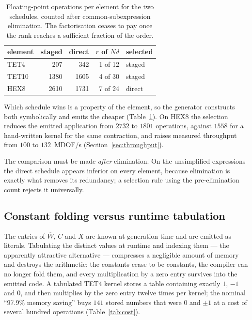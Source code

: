 \documentclass[11pt]{article}
\newcommand{\Wbar}{\overline{W}}
\begin{document}
\begin{table}[ht]
\centering
\begin{tabular}{lrrrl}
\toprule
element & staged & direct & $r$ of $Nd$ & selected \\
\midrule
TET4  &  207 &  342 &  1 of 12 & staged \\
TET10 & 1380 & 1605 &  4 of 30 & staged \\
HEX8  & 2610 & 1731 &  7 of 24 & direct \\
\bottomrule
\end{tabular}
\caption{Floating-point operations per element for the two schedules, counted
after common-subexpression elimination.  The factorisation ceases to pay once
the rank reaches a sufficient fraction of the order.}
\label{tab:ordering}
\end{table}

Which schedule wins is a property of the element, so the generator constructs
both symbolically and emits the cheaper (Table~\ref{tab:ordering}).  On HEX8 the
selection reduces the emitted application from $2732$ to $1801$ operations,
against $1558$ for a hand-written kernel for the same contraction, and raises
measured throughput from $100$ to $132$~MDOF/s (Section~\ref{sec:throughput}).

The comparison must be made \emph{after} elimination.  On the unsimplified
expressions the direct schedule appears inferior on every element, because
elimination is exactly what removes its redundancy; a selection rule using the
pre-elimination count rejects it universally.

\subsection{Constant folding versus runtime tabulation}

The entries of $\Wbar$, $C$ and $X$ are known at generation time and are emitted
as literals.  Tabulating the distinct values at runtime and indexing them --- the
apparently attractive alternative --- compresses a negligible amount of memory
and destroys the arithmetic: the constants cease to be constants, the compiler
can no longer fold them, and every multiplication by a zero entry survives into
the emitted code.  A tabulated TET4 kernel stores a table containing exactly $1$,
$-1$ and $0$, and then multiplies by the zero entry twelve times per kernel; the
nominal ``$97.9\%$ memory saving'' buys $141$ stored numbers that were $0$ and
$\pm1$ at a cost of several hundred operations (Table~\ref{tab:cost}).
\end{document}
